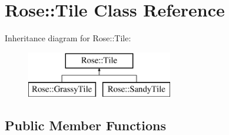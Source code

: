 \hypertarget{classRose_1_1Tile}{}\section{Rose\+::Tile Class Reference}
\label{classRose_1_1Tile}
Inheritance diagram for Rose\+::Tile\+:\begin{figure}[H]
\begin{center}
\leavevmode
\includegraphics[height=2.000000cm]{classRose_1_1Tile}
\end{center}
\end{figure}
\subsection*{Public Member Functions}
